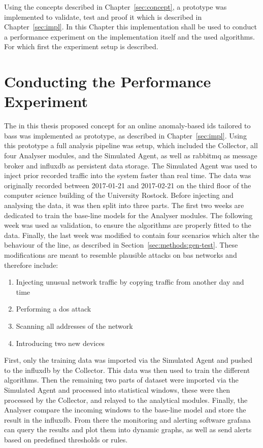 Using the concepts described in Chapter~\ref{sec:concept}, a prototype was implemented to validate, test and proof it which is described in Chapter~\ref{sec:impl}.
In this Chapter this implementation shall be used to conduct a performance experiment on the implementation itself and the used algorithms.
For which first the experiment setup is described.

\section{Conducting the Performance Experiment}
\label{sec:results:experiment}

The in this thesis proposed concept for an online anomaly-based \gls{ids} tailored to \glspl{bas} was implemented as prototype, as described in Chapter~\ref{sec:impl}.
Using this prototype a full analysis pipeline was setup, which included the Collector, all four Analyser modules, and the Simulated Agent, as well as \gls{rabbitmq} as message broker and \gls{influxdb} as persistent data storage.
The Simulated Agent was used to inject prior recorded traffic into the system faster than real time.
The data was originally recorded between 2017-01-21 and 2017-02-21 on the third floor of the computer science building of the University Rostock.
Before injecting and analysing the data, it was then split into three parts. The first two weeks are dedicated to train the base-line models for the Analyser modules. The following week was used as validation, to ensure the algorithms are properly fitted to the data. Finally, the last week was modified to contain four scenarios which alter the behaviour of the line, as described in Section~\ref{sec:methods:gen-test}.
\newpage
These modifications are meant to resemble plausible attacks on \gls{bas} networks and therefore include:

\begin{enumerate}
	\item Injecting unusual network traffic by copying traffic from another day and time
	\item Performing a \gls{dos} attack
	\item Scanning all addresses of the network
	\item Introducing two new devices
\end{enumerate}

First, only the training data was imported via the Simulated Agent and pushed to the \gls{influxdb} by the Collector. This data was then used to train the different algorithms.
Then the remaining two parts of dataset were imported via the Simulated Agent and processed into statistical windows, these were then processed by the Collector, and relayed to the analytical modules. Finally, the Analyser compare the incoming windows to the base-line model and store the result in the \gls{influxdb}. From there the monitoring and alerting software \gls{grafana} can query the results and plot them into dynamic graphs, as well as send alerts based on predefined thresholds or rules.

